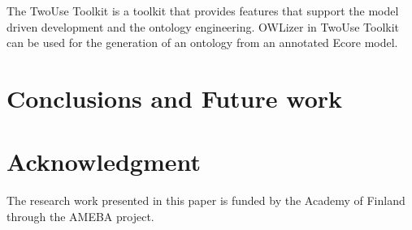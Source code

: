 \documentclass[[10pt,abbrv]{llncs}
\begin{document}
The TwoUse Toolkit is a toolkit that provides features that support the model driven development and the ontology engineering. OWLizer in TwoUse Toolkit can be used for the generation of an ontology from an annotated Ecore model.
\section{Conclusions and Future work}


\section*{Acknowledgment} The research work presented in this paper is funded by the Academy of Finland through the AMEBA project.



\end{document}
